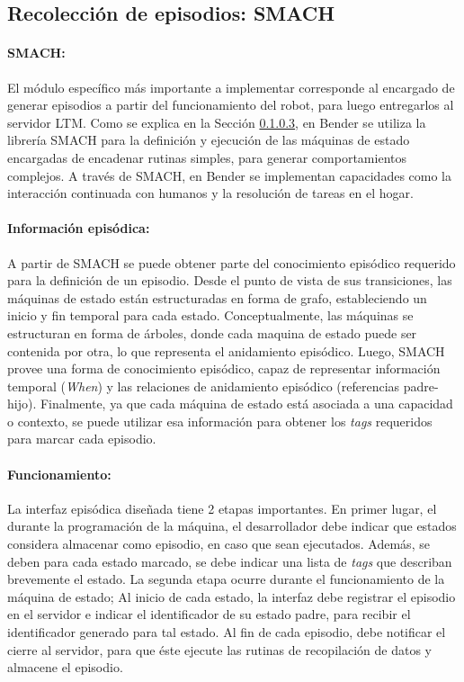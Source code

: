 \subsection{Recolección de episodios: SMACH}

\paragraph{SMACH:}
El módulo específico más importante a implementar corresponde al encargado de generar episodios a partir del funcionamiento del robot, para luego entregarlos al servidor LTM. Como se explica en la Sección \ref{}, en Bender se utiliza la librería SMACH para la definición y ejecución de las máquinas de estado encargadas de encadenar rutinas simples, para generar comportamientos complejos. A través de SMACH, en Bender se implementan capacidades como la interacción continuada con humanos y la resolución de tareas en el hogar. 

\paragraph{Información episódica:}
A partir de SMACH se puede obtener parte del conocimiento episódico requerido para la definición de un episodio. Desde el punto de vista de sus transiciones, las máquinas de estado están estructuradas en forma de grafo, estableciendo un inicio y fin temporal para cada estado. Conceptualmente, las máquinas se estructuran en forma de árboles, donde cada maquina de estado puede ser contenida por otra, lo que representa el anidamiento episódico. Luego, SMACH provee una forma de conocimiento episódico, capaz de representar información temporal (\textit{When}) y las relaciones de anidamiento episódico (referencias padre-hijo). Finalmente, ya que cada máquina de estado está asociada a una capacidad o contexto, se puede utilizar esa información para obtener los \textit{tags} requeridos para marcar cada episodio.

\paragraph{Funcionamiento:}
La interfaz episódica diseñada tiene 2 etapas importantes. En primer lugar, el durante la programación de la máquina, el desarrollador debe indicar que estados considera almacenar como episodio, en caso que sean ejecutados. Además, se deben para cada estado marcado, se debe indicar una lista de \textit{tags} que describan brevemente el estado. La segunda etapa ocurre durante el funcionamiento de la máquina de estado; Al inicio de cada estado, la interfaz debe registrar el episodio en el servidor e indicar el identificador de su estado padre, para recibir el identificador generado para tal estado. Al fin de cada episodio, debe notificar el cierre al servidor, para que éste ejecute las rutinas de recopilación de datos y almacene el episodio.


